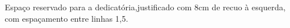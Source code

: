 \begin{dedicatoria}
 \vspace*{20cm}
\noindent\hspace{8cm} %
\begin{minipage}{8cm} %
    {\setlength{\baselineskip}{1.5\baselineskip} %
    \noindent %
    {Espaço reservado para a dedicatória,justificado com 8cm de recuo à esquerda, com espaçamento entre linhas 1,5.}}
\end{minipage}

\end{dedicatoria}
